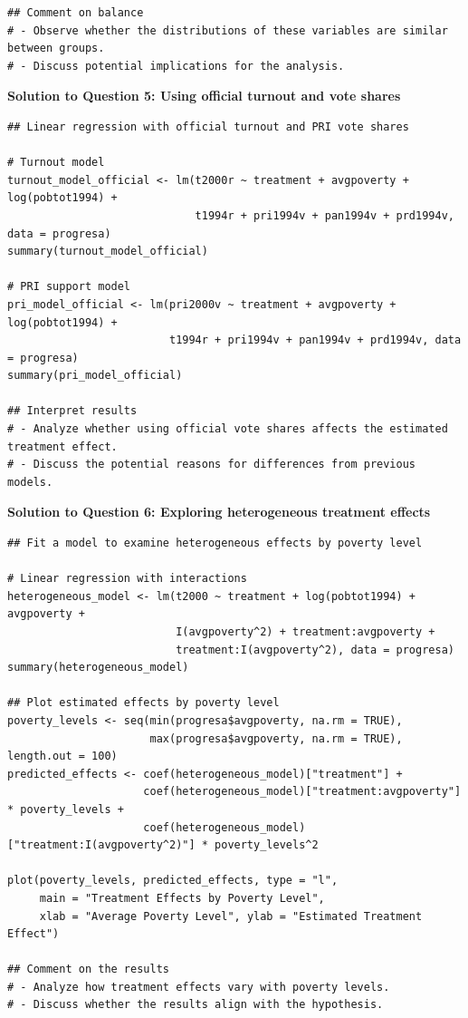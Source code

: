 \documentclass[12pt]{article}
\begin{document}
{\begin{verbatim}
## Comment on balance
# - Observe whether the distributions of these variables are similar between groups.
# - Discuss potential implications for the analysis.
\end{verbatim}

\textbf{Solution to Question 5: Using official turnout and vote shares}

\begin{verbatim}
## Linear regression with official turnout and PRI vote shares

# Turnout model
turnout_model_official <- lm(t2000r ~ treatment + avgpoverty + log(pobtot1994) + 
                             t1994r + pri1994v + pan1994v + prd1994v, data = progresa)
summary(turnout_model_official)

# PRI support model
pri_model_official <- lm(pri2000v ~ treatment + avgpoverty + log(pobtot1994) + 
                         t1994r + pri1994v + pan1994v + prd1994v, data = progresa)
summary(pri_model_official)

## Interpret results
# - Analyze whether using official vote shares affects the estimated treatment effect.
# - Discuss the potential reasons for differences from previous models.
\end{verbatim}

\textbf{Solution to Question 6: Exploring heterogeneous treatment effects}

\begin{verbatim}
## Fit a model to examine heterogeneous effects by poverty level

# Linear regression with interactions
heterogeneous_model <- lm(t2000 ~ treatment + log(pobtot1994) + avgpoverty + 
                          I(avgpoverty^2) + treatment:avgpoverty + 
                          treatment:I(avgpoverty^2), data = progresa)
summary(heterogeneous_model)

## Plot estimated effects by poverty level
poverty_levels <- seq(min(progresa$avgpoverty, na.rm = TRUE), 
                      max(progresa$avgpoverty, na.rm = TRUE), length.out = 100)
predicted_effects <- coef(heterogeneous_model)["treatment"] + 
                     coef(heterogeneous_model)["treatment:avgpoverty"] * poverty_levels + 
                     coef(heterogeneous_model)["treatment:I(avgpoverty^2)"] * poverty_levels^2

plot(poverty_levels, predicted_effects, type = "l", 
     main = "Treatment Effects by Poverty Level",
     xlab = "Average Poverty Level", ylab = "Estimated Treatment Effect")

## Comment on the results
# - Analyze how treatment effects vary with poverty levels.
# - Discuss whether the results align with the hypothesis.
\end{verbatim}
}
\fi
\end{document}
